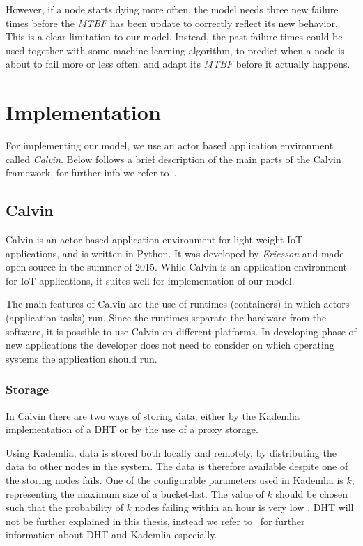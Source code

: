 \documentclass{cslthse-msc}
\begin{document}
However, if a node starts dying more often, the model needs three new failure times before the \emph{MTBF} has been update to correctly reflect its new behavior. This is a clear limitation to our model. Instead, the past failure times could be used together with some machine-learning algorithm, to predict when a node is about to fail more or less often, and adapt its \emph{MTBF} before it actually happens.

\section{Implementation} \label{sec:design_implementation}
For implementing our model, we use an actor based application environment called \emph{Calvin}. Below follows a brief description of the main parts of the Calvin framework, for further info we refer to~\cite{calvin}.

\subsection{Calvin} \label{subsec:design_calvin}
Calvin is an actor-based application environment for light-weight IoT applications, and is written in Python. It was developed by \emph{Ericsson} and made open source in the summer of 2015. While Calvin is an application environment for IoT applications, it suites well for implementation of our model.

The main features of Calvin are the use of runtimes (containers) in which actors (application tasks) run. Since the runtimes separate the hardware from the software, it is possible to use Calvin on different platforms. In developing phase of new applications the developer does not need to consider on which operating systems the application should run.

\subsubsection{Storage} \label{sec:calvin_storage}
In Calvin there are two ways of storing data, either by the Kademlia implementation of a DHT or by the use of a proxy storage.

Using Kademlia, data is stored both locally and remotely, by distributing the data to other nodes in the system. The data is therefore available despite one of the storing nodes fails. One of the configurable parameters used in Kademlia is $k$, representing the maximum size of a bucket-list. The value of $k$ should be chosen such that the probability of $k$ nodes failing within an hour is very low \cite{kademlia}. DHT will not be further explained in this thesis, instead we refer to~\cite{kademlia} for further information about DHT and Kademlia especially. 
\end{document}
